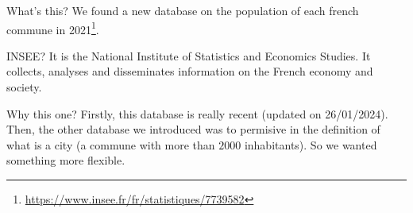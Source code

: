 \begin{frame}{What's this?}
    We found a new database on the population of each french commune in 2021\footnote{\url{https://www.insee.fr/fr/statistiques/7739582}}.
    \begin{block}{INSEE?}
        It is the National Institute of Statistics and Economics Studies. It collects, analyses and disseminates information on the French economy and society.
    \end{block}

    \begin{block}{Why this one?}
        Firstly, this database is really recent (updated on 26/01/2024). Then, the other database we introduced was to permisive in the definition of what is a city (a commune with more than $2000$ inhabitants).
        So we wanted something more flexible.
    \end{block}
\end{frame}